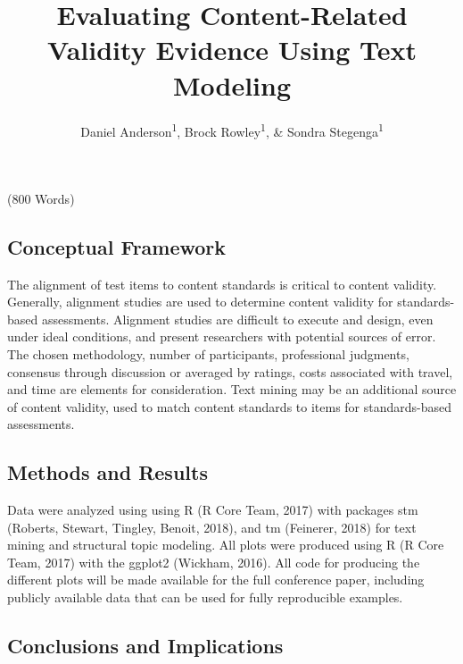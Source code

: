 \documentclass[doc]{apa6}
\title{Evaluating Content-Related Validity Evidence Using Text Modeling}
\author{Daniel Anderson\textsuperscript{1}, Brock Rowley\textsuperscript{1}, \& Sondra Stegenga\textsuperscript{1}}
\affiliation{
    \vspace{0.5cm}
          \textsuperscript{1} University of Oregon  }
\theoremstyle{definition}
\theoremstyle{definition}
\theoremstyle{definition}
\theoremstyle{remark}
\begin{document}
\maketitle

\setcounter{secnumdepth}{0}



(800 Words)

\hypertarget{conceptual-framework}{%
\subsection{Conceptual Framework}\label{conceptual-framework}}

The alignment of test items to content standards is critical to content
validity. Generally, alignment studies are used to determine content
validity for standards-based assessments. Alignment studies are
difficult to execute and design, even under ideal conditions, and
present researchers with potential sources of error. The chosen
methodology, number of participants, professional judgments, consensus
through discussion or averaged by ratings, costs associated with travel,
and time are elements for consideration. Text mining may be an
additional source of content validity, used to match content standards
to items for standards-based assessments.

\hypertarget{methods-and-results}{%
\subsection{Methods and Results}\label{methods-and-results}}

Data were analyzed using using R (R Core Team, 2017) with packages stm
(Roberts, Stewart, Tingley, Benoit, 2018), and tm (Feinerer, 2018) for
text mining and structural topic modeling. All plots were produced using
R (R Core Team, 2017) with the ggplot2 (Wickham, 2016). All code for
producing the different plots will be made available for the full
conference paper, including publicly available data that can be used for
fully reproducible examples.

\hypertarget{conclusions-and-implications}{%
\subsection{Conclusions and
Implications}\label{conclusions-and-implications}}
\end{document}
